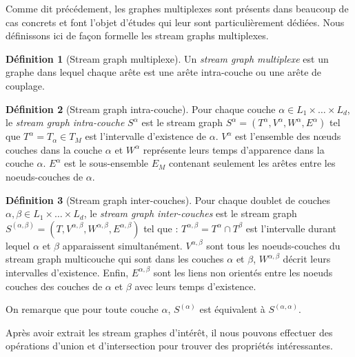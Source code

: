\documentclass[11pt,a4paper]{article}
\theoremstyle{definition}
\newtheorem{defn}{Définition}
\theoremstyle{remark}
\theoremstyle{remark}
\begin{document}
	
	Comme dit précédement, les graphes multiplexes sont présents dans beaucoup de cas concrets et font l'objet d'études qui leur sont particulièrement dédiées. Nous définissons ici de façon formelle les stream graphs multiplexes.
	
	\begin{defn}[Stream graph multiplexe]	
	Un {\em stream graph multiplexe} est un graphe dans lequel chaque arête est une arête intra-couche ou une arête de couplage.
	\end{defn}
	
	
	 
	\begin{defn}[Stream graph intra-couche]
	Pour chaque couche $\alpha \in L_1 \times \dots \times L_d$, le {\em stream graph intra-couche} $S^{\alpha}$ est le stream graph $S^{\alpha}=(T^{\alpha},V^{\alpha},W^{\alpha},E^{\alpha})$ tel que $T^{\alpha} = T_{\alpha} \in T_M$ est l'intervalle d'existence de $\alpha$. $V^{\alpha}$ est l'ensemble des nœuds couches dans la couche $\alpha$ et $W^{\alpha}$ représente leurs temps d'apparence dans la couche $\alpha$. $E^{\alpha}$ est le sous-ensemble $E_M$ contenant seulement les arêtes entre les noeuds-couches de $\alpha$.
	\end{defn}
	
	
	\begin{defn}[Stream graph inter-couches]	
	Pour chaque doublet de couches $\alpha, \beta \in L_1\times \dots\times L_d$, le {\em stream graph inter-couches} est le stream graph $S^{(\alpha,\beta)} = (T, V^{\alpha,\beta},W^{\alpha,\beta},E^{\alpha,\beta})$ tel que : $T^{\alpha,\beta}=T^{\alpha}\cap T^{\beta}$ est l'intervalle durant lequel $\alpha$ et $\beta$ apparaissent simultanément. $V^{\alpha,\beta}$ sont tous les noeuds-couches du stream graph multicouche qui sont dans les couches $\alpha$ et $\beta$, $W^{\alpha,\beta}$ décrit leurs intervalles d'existence. Enfin, $E^{\alpha,\beta}$ sont les liens non orientés entre les noeuds couches des couches de $\alpha$ et $\beta$ avec leurs temps d'existence.
	\end{defn}
	

	On remarque que pour toute couche $\alpha$, $S^{(\alpha)}$ est équivalent à $S^{(\alpha,\alpha)}$.


	Après avoir extrait les stream graphes d'intérêt, il nous pouvons effectuer des opérations d'union et d'intersection pour trouver des propriétés intéressantes.
	
\end{document}
